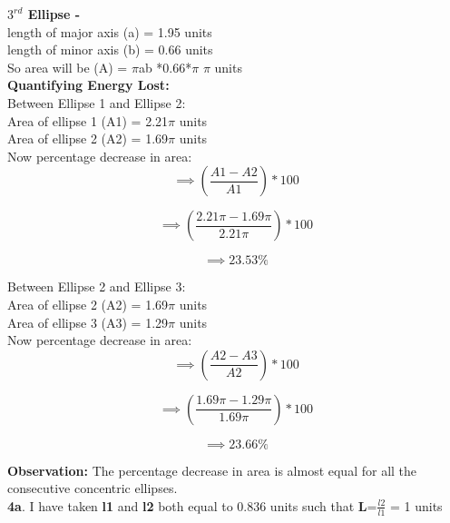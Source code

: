 \documentclass[11pt]{scrartcl} %
\begin{document}
\textbf{$3^{rd}$ Ellipse - }\\
length of major axis (a) = 1.95 units\\
length of minor axis (b) = 0.66 units\\

So area will be (A) = $\pi$ab *0.66*$\pi$ $\pi$ units\\

\textbf{Quantifying Energy Lost:}\\
Between Ellipse 1 and Ellipse 2:\\

Area of ellipse 1 (A1) = 2.21$\pi$ units\\
Area of ellipse 2 (A2) = 1.69$\pi$ units\\

Now percentage decrease in area:
\begin{equation*}
\implies (\frac{A1-A2}{A1})*100
\end{equation*}

\begin{equation*}
\implies (\frac{2.21\pi-1.69\pi}{2.21\pi})*100
\end{equation*}

\begin{equation*}
\implies 23.53 \%
\end{equation*}

Between Ellipse 2 and Ellipse 3:\\

Area of ellipse 2 (A2) = 1.69$\pi$ units\\
Area of ellipse 3 (A3) = 1.29$\pi$ units\\

Now percentage decrease in area:
\begin{equation*}
\implies (\frac{A2-A3}{A2})*100
\end{equation*}

\begin{equation*}
\implies (\frac{1.69\pi-1.29\pi}{1.69\pi})*100
\end{equation*}

\begin{equation*}
\implies 23.66 \%
\end{equation*}

\textbf{Observation:}
The percentage decrease in area is almost equal for all the consecutive concentric ellipses.\\

\textbf{4a}.
I have taken \textbf{l1} and \textbf{l2} both equal to 0.836 units such that \textbf{L}=$\frac{l2}{l1}$ = 1 units\\
\end{document}
